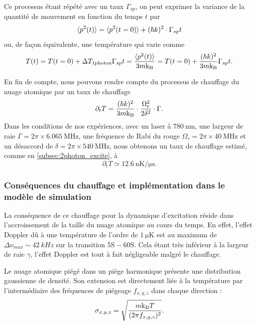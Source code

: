 Ce processus étant répété avec un taux $\Gamma_{sp}$, on peut exprimer la variance de la quantité de mouvement en fonction du temps $t$ par
\begin{equation}
\label{eq:momentum_randomwalk}
\braket{p^2 (t)} = \braket{p^2(t=0)} + (\hbar k)^2 \cdot \Gamma_{sp}t
\end{equation}
ou, de façon équivalente, une température qui varie comme
\begin{equation}
\label{eq:heating_randomwalk}
T(t) = T(t=0) + \Delta T_{\text{1photon}}\Gamma_{sp}t = \frac{\braket{p^2 (t)}}{3m\mathrm{k_B}} =
T(t=0) + \frac{(\hbar k)^2}{3m\mathrm{k_B}} \Gamma_{sp} t.
\end{equation}

En fin de compte, nous pouvons rendre compte du processus de chauffage du nuage atomique par un taux de chauffage
\begin{equation}
\label{eq:heating_rate}
\partial_t T = \frac{(\hbar k)^2}{3m\mathrm{k_B}} \cdot \frac{\Omega_r^2}{2\delta^2} \cdot \Gamma.
\end{equation}
Dans les conditions de nos expériences, avec un laser à $\SI{780}{\nano\meter}$, une largeur de raie $\Gamma = 2\pi\times \SI{6.065}{\MHz}$, une fréquence de Rabi du rouge $\Omega_r = 2\pi\times \SI{40}{\MHz}$ et un désaccord de $\delta = 2\pi \times \SI{540}{\MHz}$, nous obtenons un taux de chauffage estimé, comme en \ref{subsec:2photon_excite}, à
\begin{equation}
\label{heating_rate_value}
\partial_t T \simeq \SI{12.6}{\nano\K / \micro\second}.
\end{equation}

\subsubsection*{Conséquences du chauffage et implémentation dans le modèle de simulation}
\noindent La conséquence de ce chauffage pour la dynamique d'excitation réside dans l'accroissement de la taille du nuage atomique au cours du temps.
En effet, l'effet Doppler dû à une température de l'ordre de $\SI{1}{\micro\kelvin}$ est au maximum de $\Delta \nu_{max} \sim \SI{42}{kHz}$ sur la transition $\mathrm{5S-60S}$.
Cela étant très inférieur à la largeur de raie $\gamma$, l'effet Doppler est tout à fait négligeable malgré le chauffage.

Le nuage atomique piégé dans un piège harmonique présente une distribution gaussienne de densité.
Son extension est directement liée à la température par l'intermédiaire des fréquences de piégeage $f_{x,y,z}$ dans chaque direction :
\begin{equation}
\label{eq:trap_size_temp}
\sigma_{x,y,z} = \sqrt{\frac{m\mathrm{k_B} T}{(2\pi f_{x,y,z})^2}}.
\end{equation}

